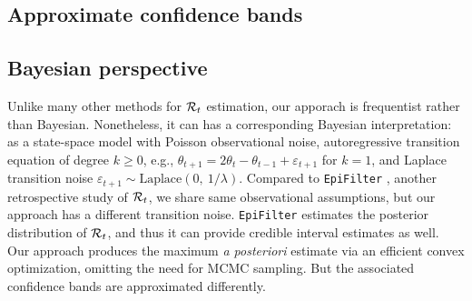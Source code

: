 
\subsection{Approximate confidence bands}


\subsection{Bayesian perspective}

Unlike many other methods for $\mathcal{R}_t$ estimation, our apporach is frequentist
rather than Bayesian. Nonetheless, it can has a corresponding Bayesian
interpretation: as a state-space model with Poisson observational noise,
autoregressive transition equation of degree $k\geq 0$, e.g., $\theta_{t+1} =
2\theta_t - \theta_{t-1} + \varepsilon_{t+1}$ for $k=1$, and Laplace transition
noise $\varepsilon_{t+1}\sim \mathrm{Laplace}(0,\ 1/\lambda)$. Compared to
\texttt{EpiFilter} \citep{parag2021improved}, another retrospective study of
$\mathcal{R}_t$, we share same observational assumptions, but our approach has a
different transition noise. \texttt{EpiFilter} estimates the posterior
distribution of
$\mathcal{R}_t$, and thus it can provide credible interval estimates as well. Our
approach produces the maximum \emph{a posteriori} estimate via an efficient
convex optimization, omitting the need for MCMC sampling. But the associated
confidence bands are approximated differently.

